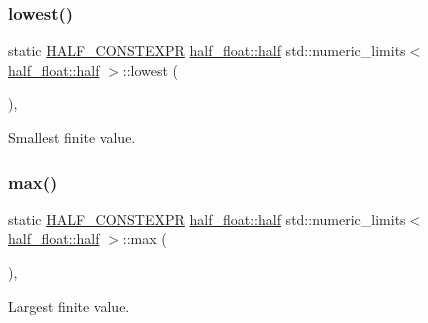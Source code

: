 \subsubsection{\texorpdfstring{lowest()}{lowest()}}
{\footnotesize\ttfamily static \hyperlink{half_8hpp_ace3116a3e2cd66dd15780b92060987c7}{H\+A\+L\+F\+\_\+\+C\+O\+N\+S\+T\+E\+X\+PR} \hyperlink{classhalf__float_1_1half}{half\+\_\+float\+::half} std\+::numeric\+\_\+limits$<$ \hyperlink{classhalf__float_1_1half}{half\+\_\+float\+::half} $>$\+::lowest (\begin{DoxyParamCaption}{ }\end{DoxyParamCaption})\hspace{0.3cm}{\ttfamily [inline]}, {\ttfamily [static]}}



Smallest finite value. 

\mbox{\label{classstd_1_1numeric__limits_3_01half__float_1_1half_01_4_a18dff56a912af3306b967a49a7a1a859}} 
\subsubsection{\texorpdfstring{max()}{max()}}
{\footnotesize\ttfamily static \hyperlink{half_8hpp_ace3116a3e2cd66dd15780b92060987c7}{H\+A\+L\+F\+\_\+\+C\+O\+N\+S\+T\+E\+X\+PR} \hyperlink{classhalf__float_1_1half}{half\+\_\+float\+::half} std\+::numeric\+\_\+limits$<$ \hyperlink{classhalf__float_1_1half}{half\+\_\+float\+::half} $>$\+::max (\begin{DoxyParamCaption}{ }\end{DoxyParamCaption})\hspace{0.3cm}{\ttfamily [inline]}, {\ttfamily [static]}}



Largest finite value. 

\mbox{\label{classstd_1_1numeric__limits_3_01half__float_1_1half_01_4_a52dd448e009c0a1a7e463c773cbd8f9e}} 
